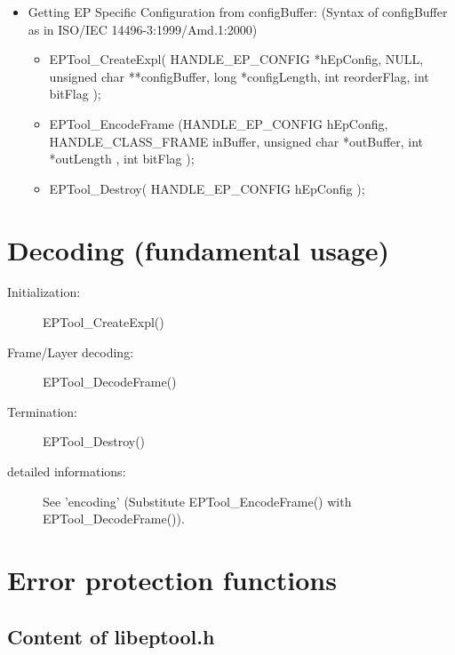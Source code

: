 \documentclass[a4paper]{article}
\begin{document}
\begin{description}
\begin{itemize}
\begin{itemize}
          \item not handing over EP Specific Configuration in to configBuffer:

          \begin{itemize}
          \item EPTool\_CreateExpl( HANDLE\_EP\_CONFIG *hEpConfig,  const char
          *predFileName, NULL, NULL, int reorderFlag, int bitFlag );
          \item EPTool\_EncodeFrame (HANDLE\_EP\_CONFIG hEpConfig,
          HANDLE\_CLASS\_FRAME inBuffer, unsigned char *outBuffer, int
          *outLength , int bitFlag );
          \item EPTool\_Destroy( HANDLE\_EP\_CONFIG hEpConfig );
          \end{itemize}

        \end{itemize}

      \item Getting EP Specific Configuration from configBuffer:
        (Syntax of configBuffer as in ISO/IEC 14496-3:1999/Amd.1:2000)
        \begin{itemize}
           \item EPTool\_CreateExpl( HANDLE\_EP\_CONFIG *hEpConfig, NULL, unsigned char **configBuffer, long
          *configLength, int reorderFlag, int bitFlag );
            \item EPTool\_EncodeFrame (HANDLE\_EP\_CONFIG hEpConfig,
          HANDLE\_CLASS\_FRAME inBuffer, unsigned char *outBuffer, int
          *outLength , int bitFlag );
            \item EPTool\_Destroy( HANDLE\_EP\_CONFIG hEpConfig );
          \end{itemize}
      \end{itemize}
 
\end{description}

\section{Decoding (fundamental usage)}
\begin{description}
\item[Initialization:] EPTool\_CreateExpl()
\item[Frame/Layer decoding:] EPTool\_DecodeFrame() 
\item[Termination:] EPTool\_Destroy()
\item[detailed informations:]
  See 'encoding' (Substitute EPTool\_EncodeFrame() with EPTool\_DecodeFrame()). 
\end{description}


\section{Error protection functions}
\subsection{Content of libeptool.h}

\end{document}
